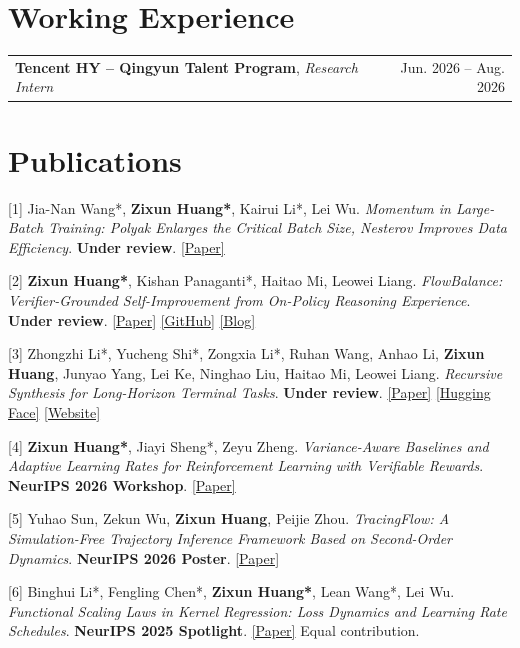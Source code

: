 \documentclass[a4paper,9pt]{extarticle}
\makeatletter
\newcommand{\datedentry}[2]{%
\begin{tabularx}{\linewidth}{@{}X r@{}}
#1 & #2
\end{tabularx}}
\makeatother
\begin{document}
\section{Working Experience}
\datedentry{\textbf{Tencent HY -- Qingyun Talent Program}, \textit{Research Intern}}{Jun. 2026 -- Aug. 2026}

\section{Publications}
[1] Jia-Nan Wang*, \textbf{Zixun Huang*}, Kairui Li*, Lei Wu. \textit{Momentum in Large-Batch Training: Polyak Enlarges the Critical Batch Size, Nesterov Improves Data Efficiency}. \textbf{Under review}. \href{https://arxiv.org/pdf/2609.02728}{[Paper]}

[2] \textbf{Zixun Huang*}, Kishan Panaganti*, Haitao Mi, Leowei Liang. \textit{FlowBalance: Verifier-Grounded Self-Improvement from On-Policy Reasoning Experience}. \textbf{Under review}. \href{https://arxiv.org/abs/2609.03241}{[Paper]} \href{https://github.com/alexhuang13/FlowBalance}{[GitHub]} \href{https://alexhuang13.github.io/FlowBalance-Blog/}{[Blog]}

[3] Zhongzhi Li*, Yucheng Shi*, Zongxia Li*, Ruhan Wang, Anhao Li, \textbf{Zixun Huang}, Junyao Yang, Lei Ke, Ninghao Liu, Haitao Mi, Leowei Liang. \textit{Recursive Synthesis for Long-Horizon Terminal Tasks}. \textbf{Under review}. \href{https://arxiv.org/abs/2608.05466}{[Paper]} \href{https://huggingface.co/collections/Zhongzhi1228/recursive-synthesis-for-long-horizon-terminal-tasks}{[Hugging Face]} \href{https://zhongzhi660.github.io/recursive-verified-synthesis-site/?case=jobs-diff-01-3341b098}{[Website]}

[4] \textbf{Zixun Huang*}, Jiayi Sheng*, Zeyu Zheng. \textit{Variance-Aware Baselines and Adaptive Learning Rates for Reinforcement Learning with Verifiable Rewards}. \textbf{NeurIPS 2026 Workshop}. \href{https://arxiv.org/abs/2511.23310}{[Paper]}

[5] Yuhao Sun, Zekun Wu, \textbf{Zixun Huang}, Peijie Zhou. \textit{TracingFlow: A Simulation-Free Trajectory Inference Framework Based on Second-Order Dynamics}. \textbf{NeurIPS 2026 Poster}. \href{https://arxiv.org/pdf/2608.21070}{[Paper]}

[6] Binghui Li*, Fengling Chen*, \textbf{Zixun Huang*}, Lean Wang*, Lei Wu. \textit{Functional Scaling Laws in Kernel Regression: Loss Dynamics and Learning Rate Schedules}. \textcolor[HTML]{8B0000}{\textbf{NeurIPS 2025 Spotlight}}. \href{https://arxiv.org/abs/2509.19189}{[Paper]} {\footnotesize * Equal contribution.}
\end{document}
